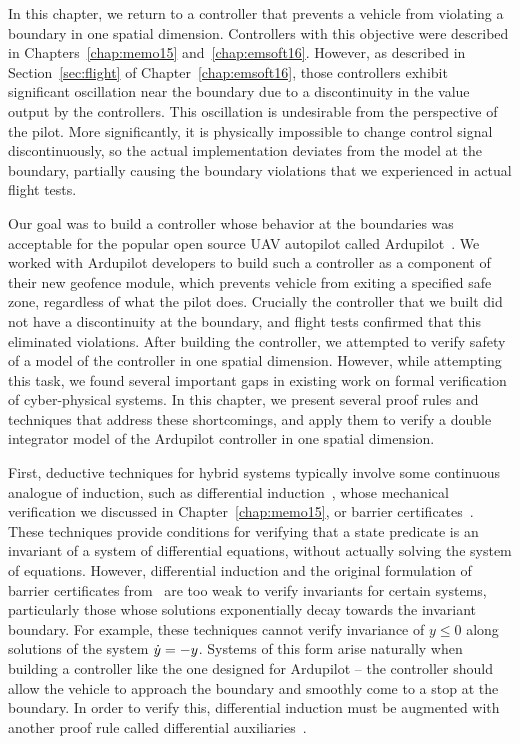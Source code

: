 In this chapter, we return to a controller that prevents a vehicle from
violating a boundary in one spatial dimension. Controllers with this
objective were described in Chapters~\ref{chap:memo15}
and~\ref{chap:emsoft16}. However, as described in Section~\ref{sec:flight}
of Chapter~\ref{chap:emsoft16}, those controllers exhibit significant
oscillation near the boundary due to a discontinuity in the value output by
the controllers. This oscillation is undesirable from the perspective of
the pilot. More significantly, it is physically impossible to change
control signal discontinuously, so the actual implementation deviates from
the model at the boundary, partially causing the boundary violations that
we experienced in actual flight tests.

Our goal was to build a controller whose behavior at the boundaries was
acceptable for the popular open source UAV autopilot called
Ardupilot~\cite{ardupilot}. We worked with Ardupilot developers to build
such a controller as a component of their new geofence module, which
prevents vehicle from exiting a specified safe zone, regardless of what the
pilot does. Crucially the controller that we built did not have a
discontinuity at the boundary, and flight tests confirmed that this
eliminated violations. After building the controller, we attempted to
verify safety of a model of the controller in one spatial dimension.
However, while attempting this task, we found several important gaps in
existing work on formal verification of cyber-physical systems. In this
chapter, we present several proof rules and techniques that address these
shortcomings, and apply them to verify a double integrator model of the
Ardupilot controller in one spatial dimension.

First, deductive techniques for hybrid systems typically involve some
continuous analogue of induction, such as differential
induction~\cite{Platzer10DAL}, whose mechanical verification we
discussed in Chapter~\ref{chap:memo15}, or barrier
certificates~\cite{prajna04barrier}. These techniques provide conditions
for verifying that a state predicate is an invariant of a system of
differential equations, without actually solving the system of
equations. However, differential induction and the original formulation of
barrier certificates from~\cite{prajna04barrier} are too weak to verify
invariants for certain systems, particularly those whose solutions
exponentially decay towards the invariant boundary. For example, these
techniques cannot verify invariance of $y \leq 0$ along solutions of the
system $\dot{y} = -y$. Systems of this form arise naturally when building a
controller like the one designed for Ardupilot -- the controller should
allow the vehicle to approach the boundary and smoothly come to a stop at
the boundary. In order to verify this, differential induction must be
augmented with another proof rule called differential
auxiliaries~\cite{Platzer12diffcut}.

